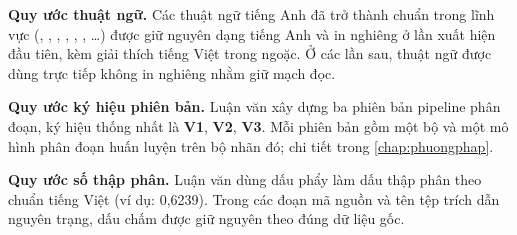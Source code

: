 \vspace{0.6cm}
\noindent\textbf{Quy ước thuật ngữ.} Các thuật ngữ tiếng Anh đã trở thành chuẩn
trong lĩnh vực (, , ,
, , , \dots) được giữ
nguyên dạng tiếng Anh và in nghiêng ở lần xuất hiện đầu tiên, kèm giải thích
tiếng Việt trong ngoặc. Ở các lần sau, thuật ngữ được dùng trực tiếp không in
nghiêng nhằm giữ mạch đọc.

\vspace{0.4cm}
\noindent\textbf{Quy ước ký hiệu phiên bản.} Luận văn xây dựng ba phiên bản
pipeline phân đoạn, ký hiệu thống nhất là \textbf{V1}, \textbf{V2}, \textbf{V3}.
Mỗi phiên bản gồm một bộ  và một mô hình phân đoạn huấn luyện
trên bộ nhãn đó; chi tiết trong \cref{chap:phuongphap}.

\vspace{0.4cm}
\noindent\textbf{Quy ước số thập phân.} Luận văn dùng dấu phẩy làm dấu thập phân
theo chuẩn tiếng Việt (ví dụ: 0,6239). Trong các đoạn mã nguồn và tên tệp trích
dẫn nguyên trạng, dấu chấm được giữ nguyên theo đúng dữ liệu gốc.
